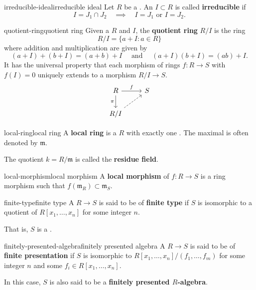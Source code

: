 \begin{topic}{irreducible-ideal}{irreducible ideal}
    Let $R$ be a . An  $I \subset R$ is called \textbf{irreducible} if
    \[ I = J_1 \cap J_2 \quad \implies \quad I = J_1 \text{ or } I = J_2 . \]
\end{topic}

\begin{topic}{quotient-ring}{quotient ring}
    Given a  $R$ and  $I$, the \textbf{quotient ring} $R/I$ is the ring
    \[ R/I = \{ a + I : a \in R \} \]
    where addition and multiplication are given by
    \[ (a + I) + (b + I) = (a + b) + I \quad \text{ and } \quad (a + I) (b + I) = (ab) + I . \]
    It has the universal property that each morphism of rings $f : R \to S$ with $f(I) = 0$ uniquely extends to a morphism $R/I \to S$.
    \[ \begin{tikzcd} R \arrow{r}{f} \arrow[swap]{d}{\pi} & S \\ R/I \arrow[dashed]{ur} & \end{tikzcd} \]
\end{topic}

\begin{topic}{local-ring}{local ring}
    A \textbf{local ring} is a  $R$ with exactly one . The maximal is often denoted by $\mathfrak{m}$.
    
    The quotient $k = R/\mathfrak{m}$ is called the \textbf{residue field}.
\end{topic}

\begin{topic}{local-morphism}{local morphism}
    A \textbf{local morphism} of  $f : R \to S$ is a ring morphism such that $f(\mathfrak{m}_R) \subset \mathfrak{m}_S$.
\end{topic}

\begin{topic}{finite-type}{finite type}
    A  $R \to S$ is said to be of \textbf{finite type} if $S$ is isomorphic to a quotient of $R[x_1, \ldots, x_n]$ for some integer $n$.
    
    That is, $S$ is a .
\end{topic}

\begin{topic}{finitely-presented-algebra}{finitely presented algebra}
    A  $R \to S$ is said to be of \textbf{finite presentation} if $S$ is isomorphic to $R[x_1, \ldots, x_n] / (f_1, \ldots, f_m)$ for some integer $n$ and some $f_i \in R[x_1, \ldots, x_n]$.
    
    In this case, $S$ is also said to be a \textbf{finitely presented $R$-algebra}.
\end{topic}

